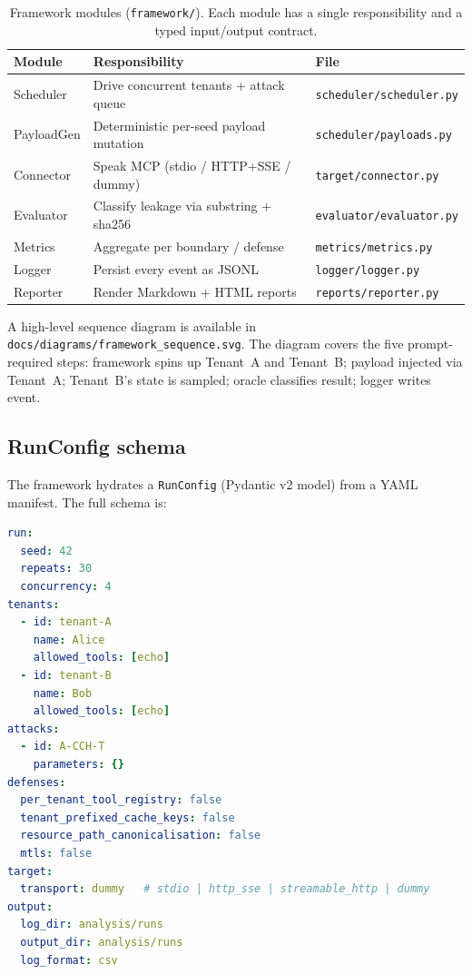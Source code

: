 \begin{table}[t]
\caption{Framework modules (\texttt{framework/}). Each module
has a single responsibility and a typed input/output contract.}
\label{tab:modules}
\centering
\small
\begin{tabularx}{\linewidth}{l X X}
\toprule
Module & Responsibility & File \\
\midrule
Scheduler    & Drive concurrent tenants + attack queue   & \texttt{scheduler/scheduler.py} \\
PayloadGen   & Deterministic per-seed payload mutation   & \texttt{scheduler/payloads.py} \\
Connector    & Speak MCP (stdio / HTTP+SSE / dummy)      & \texttt{target/connector.py} \\
Evaluator    & Classify leakage via substring + sha256   & \texttt{evaluator/evaluator.py} \\
Metrics      & Aggregate per boundary / defense          & \texttt{metrics/metrics.py} \\
Logger       & Persist every event as JSONL              & \texttt{logger/logger.py} \\
Reporter     & Render Markdown + HTML reports            & \texttt{reports/reporter.py} \\
\bottomrule
\end{tabularx}
\end{table}

A high-level sequence diagram is available in
\texttt{docs/diagrams/framework\_sequence.svg}. The diagram
covers the five prompt-required steps: framework spins up
Tenant~A and Tenant~B; payload injected via Tenant~A;
Tenant~B's state is sampled; oracle classifies result; logger
writes event.

\subsection{RunConfig schema}

The framework hydrates a \texttt{RunConfig} (Pydantic v2 model)
from a YAML manifest. The full schema is:

\begin{lstlisting}[language=yaml,caption={RunConfig schema (excerpt).},label=lst:runconfig]
run:
  seed: 42
  repeats: 30
  concurrency: 4
tenants:
  - id: tenant-A
    name: Alice
    allowed_tools: [echo]
  - id: tenant-B
    name: Bob
    allowed_tools: [echo]
attacks:
  - id: A-CCH-T
    parameters: {}
defenses:
  per_tenant_tool_registry: false
  tenant_prefixed_cache_keys: false
  resource_path_canonicalisation: false
  mtls: false
target:
  transport: dummy   # stdio | http_sse | streamable_http | dummy
output:
  log_dir: analysis/runs
  output_dir: analysis/runs
  log_format: csv
\end{lstlisting}

